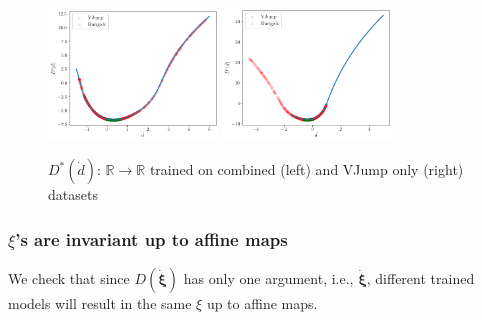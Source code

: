 \begin{figure}[H]
    \centering
    \includegraphics[width=0.4\textwidth]{images/Trial0112_combined_D_star.png}
    \includegraphics[width=0.4\textwidth]{images/Trial0112_smallA_smallDRS_D_star.png}
    \caption{$D^*(\dot{d})$: $\mathbb{R}\rightarrow \mathbb{R}$ trained on combined (left) and VJump only (right) datasets}
    \label{fig:DDaggerPlotCompare}
\end{figure}

\subsubsection{$\xi$'s are invariant up to affine maps}
We check that since $D(\dot{\bm{\xi}})$ has only one argument, i.e., $\dot{\bm{\xi}}$, 
different trained models will result in the same $\xi$ up to affine maps. 

